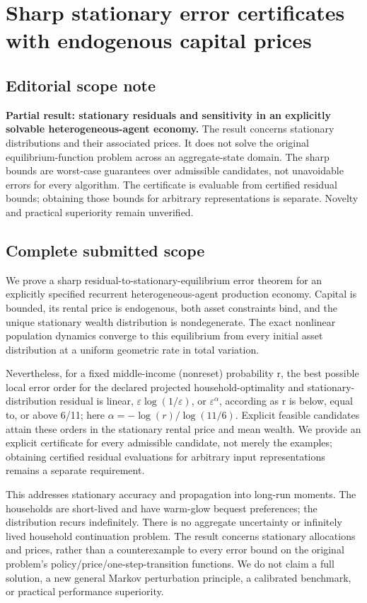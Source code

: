 \documentclass{article}
\begin{document}
\section{Sharp stationary error certificates with endogenous capital prices}

\subsection{Editorial scope note}

\textbf{Partial result: stationary residuals and sensitivity in an explicitly solvable heterogeneous-agent economy.} The result concerns stationary distributions and their associated prices. It does not solve the original equilibrium-function problem across an aggregate-state domain. The sharp bounds are worst-case guarantees over admissible candidates, not unavoidable errors for every algorithm. The certificate is evaluable from certified residual bounds; obtaining those bounds for arbitrary representations is separate. Novelty and practical superiority remain unverified.

\subsection{Complete submitted scope}

We prove a sharp residual-to-stationary-equilibrium error theorem for an explicitly specified recurrent heterogeneous-agent production economy. Capital is bounded, its rental price is endogenous, both asset constraints bind, and the unique stationary wealth distribution is nondegenerate. The exact nonlinear population dynamics converge to this equilibrium from every initial asset distribution at a uniform geometric rate in total variation.

Nevertheless, for a fixed middle-income (nonreset) probability r, the best possible local error order for the declared projected household-optimality and stationary-distribution residual is linear, \(\varepsilon\log(1/\varepsilon)\), or \(\varepsilon^\alpha\), according as r is below, equal to, or above 6/11; here \(\alpha=-\log(r)/\log(11/6)\). Explicit feasible candidates attain these orders in the stationary rental price and mean wealth. We provide an explicit certificate for every admissible candidate, not merely the examples; obtaining certified residual evaluations for arbitrary input representations remains a separate requirement.

This addresses stationary accuracy and propagation into long-run moments. The households are short-lived and have warm-glow bequest preferences; the distribution recurs indefinitely. There is no aggregate uncertainty or infinitely lived household continuation problem. The result concerns stationary allocations and prices, rather than a counterexample to every error bound on the original problem's policy/price/one-step-transition functions. We do not claim a full solution, a new general Markov perturbation principle, a calibrated benchmark, or practical performance superiority.
\end{document}
